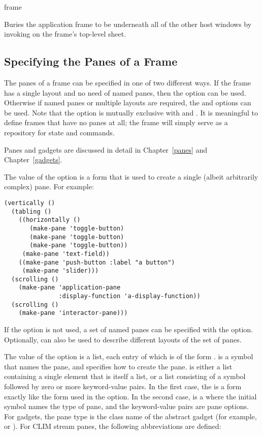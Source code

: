  {frame}

Buries the application frame  to be underneath all of the other host
windows by invoking  on the frame's top-level sheet.


\subsection {Specifying the Panes of a Frame\label{frame-panes}}

The panes of a frame can be specified in one of two different ways.  If the
frame has a single layout and no need of named panes, then the  option
can be used.  Otherwise if named panes or multiple layouts are required, the
 and  options can be used.  Note that the 
option is mutually exclusive with  and .   It is
meaningful to define frames that have no panes at all; the frame will simply
serve as a repository for state and commands.

Panes and gadgets are discussed in detail in Chapter~\ref{panes} and
Chapter~\ref{gadgets}.

The value of the  option is a form that is used to create a single
(albeit arbitrarily complex) pane.  For example:

\begin{verbatim}
(vertically ()
  (tabling ()
    ((horizontally ()
       (make-pane 'toggle-button)
       (make-pane 'toggle-button)
       (make-pane 'toggle-button))
     (make-pane 'text-field))
    ((make-pane 'push-button :label "a button")
     (make-pane 'slider)))
  (scrolling ()
    (make-pane 'application-pane
               :display-function 'a-display-function))
  (scrolling ()
    (make-pane 'interactor-pane)))
\end{verbatim}

If the  option is not used, a set of named panes can be specified with
the  option.  Optionally,  can also be used to describe
different layouts of the set of panes.

The value of the  option is a list, each entry of which is of the
form .   is a symbol that names the pane, and
 specifies how to create the pane.   is either a list
containing a single element that is itself a list, or a list consisting of a
symbol followed by zero or more keyword-value pairs.  In the first case, the
 is a form exactly like the form used in the  option.  In
the second case,  is a  where the initial
symbol names the type of pane, and the keyword-value pairs are pane options.
For gadgets, the pane type is the class name of the abstract gadget (for
example,  or ).  For CLIM stream panes, the following
abbreviations are defined:

